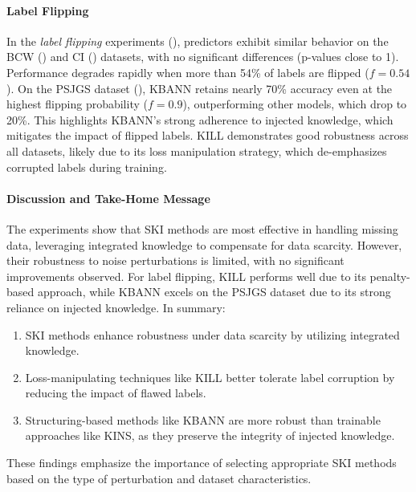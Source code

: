 \paragraph{Label Flipping}
%
In the \emph{label flipping} experiments (), predictors exhibit similar behavior on the \gls{BCW} () and \gls{CI} () datasets, with no significant differences (p-values close to 1).
%
Performance degrades rapidly when more than 54\% of labels are flipped (\(f = 0.54\)).
%
On the \gls{PSJGS} dataset (), \gls{KBANN} retains nearly 70\% accuracy even at the highest flipping probability (\(f = 0.9\)), outperforming other models, which drop to 20\%.
%
This highlights \gls{KBANN}'s strong adherence to injected knowledge, which mitigates the impact of flipped labels.
%
\gls{KILL} demonstrates good robustness across all datasets, likely due to its loss manipulation strategy, which de-emphasizes corrupted labels during training.


\paragraph{Discussion and Take-Home Message}
%
The experiments show that \gls{SKI} methods are most effective in handling missing data, leveraging integrated knowledge to compensate for data scarcity.
%
However, their robustness to noise perturbations is limited, with no significant improvements observed.
%
For label flipping, \gls{KILL} performs well due to its penalty-based approach, while \gls{KBANN} excels on the \gls{PSJGS} dataset due to its strong reliance on injected knowledge.
%
In summary:
%
\begin{enumerate}
    \item \gls{SKI} methods enhance robustness under data scarcity by utilizing integrated knowledge.
    \item Loss-manipulating techniques like \gls{KILL} better tolerate label corruption by reducing the impact of flawed labels.
    \item Structuring-based methods like \gls{KBANN} are more robust than trainable approaches like \gls{KINS}, as they preserve the integrity of injected knowledge.
\end{enumerate}
%
These findings emphasize the importance of selecting appropriate \gls{SKI} methods based on the type of perturbation and dataset characteristics.